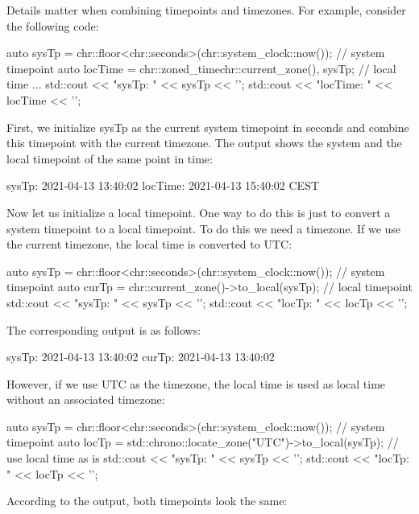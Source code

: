 Details matter when combining timepoints and timezones. For example, consider the following code:

\begin{cpp}
auto sysTp = chr::floor<chr::seconds>(chr::system_clock::now()); // system timepoint
auto locTime = chr::zoned_time{chr::current_zone(), sysTp}; // local time
...
std::cout << "sysTp:         " << sysTp << '\n';
std::cout << "locTime:       " << locTime << '\n';
\end{cpp}

First, we initialize sysTp as the current system timepoint in seconds and combine this timepoint with the current timezone. The output shows the system and the local timepoint of the same point in time:

\begin{shell}
sysTp:      2021-04-13 13:40:02
locTime:    2021-04-13 15:40:02 CEST
\end{shell}

Now let us initialize a local timepoint. One way to do this is just to convert a system timepoint to a local timepoint. To do this we need a timezone. If we use the current timezone, the local time is converted to UTC:

\begin{cpp}
auto sysTp = chr::floor<chr::seconds>(chr::system_clock::now()); // system timepoint
auto curTp = chr::current_zone()->to_local(sysTp); // local timepoint
std::cout << "sysTp:            " << sysTp << '\n';
std::cout << "locTp:            " << locTp << '\n';
\end{cpp}

The corresponding output is as follows:

\begin{shell}
sysTp:     2021-04-13 13:40:02
curTp:     2021-04-13 13:40:02
\end{shell}

However, if we use UTC as the timezone, the local time is used as local time without an associated timezone:

\begin{cpp}
auto sysTp = chr::floor<chr::seconds>(chr::system_clock::now()); // system timepoint
auto locTp = std::chrono::locate_zone("UTC")->to_local(sysTp); // use local time as is
std::cout << "sysTp:              " << sysTp << '\n';
std::cout << "locTp:              " << locTp << '\n';
\end{cpp}

According to the output, both timepoints look the same:

